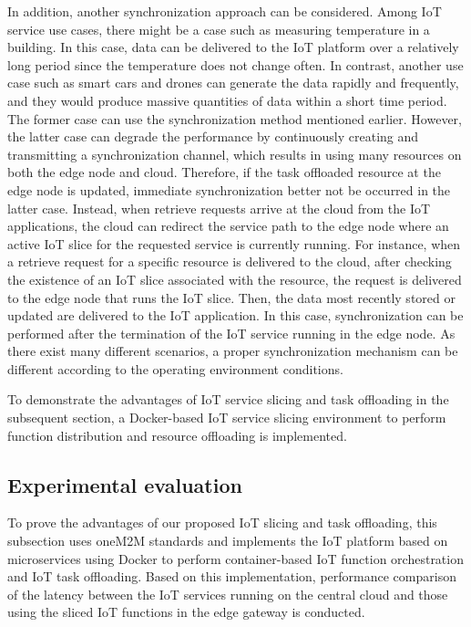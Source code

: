 In addition, another synchronization approach can be considered. 
Among IoT service use cases, there might be a case such as measuring temperature in a building. 
In this case, data can be delivered to the IoT platform over a relatively long period since the temperature does not change often. 
In contrast, another use case such as smart cars and drones can generate the data rapidly and frequently, and they would produce massive quantities of data within a short time period. 
The former case can use the synchronization method mentioned earlier. 
However, the latter case can degrade the performance by continuously creating and transmitting a synchronization channel, which results in using many resources on both the edge node and cloud. 
Therefore, if the task offloaded resource at the edge node is updated, immediate synchronization better not be occurred in the latter case. 
Instead, when retrieve requests arrive at the cloud from the IoT applications, the cloud can redirect the service path to the edge node where an active IoT slice for the requested service is currently running. 
For instance, when a retrieve request for a specific resource is delivered to the cloud, after checking the existence of an IoT slice associated with the resource, the request is delivered to the edge node that runs the IoT slice. 
Then, the data most recently stored or updated are delivered to the IoT application. 
In this case, synchronization can be performed after the termination of the IoT service running in the edge node. 
As there exist many different scenarios, a proper synchronization mechanism can be different according to the operating environment conditions. 

To demonstrate the advantages of IoT service slicing and task offloading in the subsequent section, a Docker-based IoT service slicing environment to perform function distribution and resource offloading is implemented.

\subsection{Experimental evaluation}

To prove the advantages of our proposed IoT slicing and task offloading, this subsection uses oneM2M standards and implements the IoT platform based on microservices using Docker to perform container-based IoT function orchestration and IoT task offloading. 
Based on this implementation, performance comparison of the latency between the IoT services running on the central cloud and those using the sliced IoT functions in the edge gateway is conducted.

